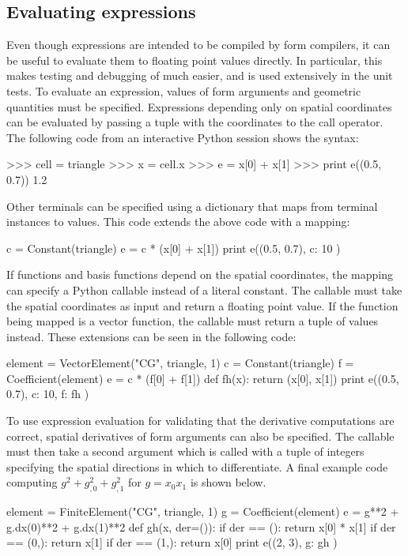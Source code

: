 \subsection{Evaluating expressions}
\label{ufl:sec:evaluating}

Even though \ufl{} expressions are intended to be compiled by form
compilers, it can be useful to evaluate them to floating point values
directly. In particular, this makes testing and debugging of \ufl{}
much easier, and is used extensively in the unit tests.  To evaluate
an \ufl{} expression, values of form arguments and geometric
quantities must be specified.  Expressions depending only on spatial
coordinates can be evaluated by passing a tuple with the coordinates
to the call operator. The following code from an interactive Python
session shows the syntax:
\begin{python}
>>> cell = triangle
>>> x = cell.x
>>> e = x[0] + x[1]
>>> print e((0.5, 0.7))
1.2
\end{python}
Other terminals can be specified using a dictionary that maps from
terminal instances to values.  This code extends the above code with a
mapping:
\begin{python}
c = Constant(triangle)
e = c * (x[0] + x[1])
print e((0.5, 0.7), { c: 10 })
\end{python}
If functions and basis functions depend on the spatial coordinates,
the mapping can specify a Python callable instead of a literal
constant.  The callable must take the spatial coordinates as input and
return a floating point value.  If the function being mapped is a
vector function, the callable must return a tuple of values instead.
These extensions can be seen in the following code:
\begin{python}
element = VectorElement("CG", triangle, 1)
c = Constant(triangle)
f = Coefficient(element)
e = c * (f[0] + f[1])
def fh(x):
    return (x[0], x[1])
print e((0.5, 0.7), { c: 10, f: fh })
\end{python}
To use expression evaluation for validating that the derivative
computations are correct, spatial derivatives of form arguments can
also be specified.  The callable must then take a second argument
which is called with a tuple of integers specifying the spatial
directions in which to differentiate. A final example code computing
$g^2 + g_{,0}^2 + g_{,1}^2$ for $g=x_0x_1$ is shown below.
\begin{python}
element = FiniteElement("CG", triangle, 1)
g = Coefficient(element)
e = g**2 + g.dx(0)**2 + g.dx(1)**2
def gh(x, der=()):
    if der == ():   return x[0] * x[1]
    if der == (0,): return x[1]
    if der == (1,): return x[0]
print e((2, 3), { g: gh })
\end{python}

